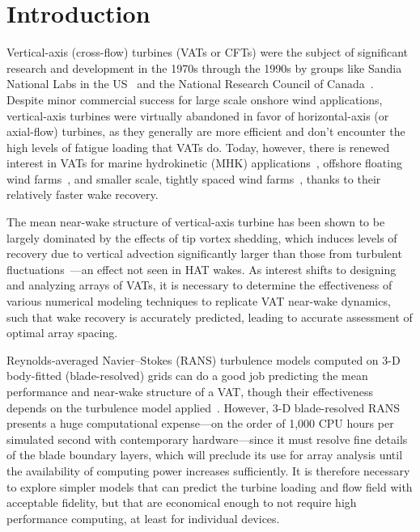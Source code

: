 \documentclass[times]{weauth}
\begin{document}

\maketitle


\section{Introduction}

Vertical-axis (cross-flow) turbines (VATs or CFTs) were the subject of
significant research and development in the 1970s through the 1990s by groups
like Sandia National Labs in the US~\cite{Sutherland2012} and the National
Research Council of Canada~\cite{Para2002}. Despite minor commercial success for
large scale onshore wind applications, vertical-axis turbines were virtually
abandoned in favor of horizontal-axis (or axial-flow) turbines, as they
generally are more efficient and don't encounter the high levels of fatigue
loading that VATs do. Today, however, there is renewed interest in VATs for
marine hydrokinetic (MHK) applications~\cite{ORPC2012}, offshore floating wind
farms~\cite{Paulsen2011, Sandia2012, Dodd2014}, and smaller scale, tightly
spaced wind farms~\cite{Dabiri2011, Kinzel2012}, thanks to their relatively
faster wake recovery.

The mean near-wake structure of vertical-axis turbine has been shown to be
largely dominated by the effects of tip vortex shedding, which induces levels of
recovery due to vertical advection significantly larger than those from
turbulent fluctuations~\cite{Bachant2015-JoT}---an effect not seen in HAT wakes.
As interest shifts to designing and analyzing arrays of VATs, it is necessary to
determine the effectiveness of various numerical modeling techniques to
replicate VAT near-wake dynamics, such that wake recovery is accurately
predicted, leading to accurate assessment of optimal array spacing.

Reynolds-averaged Navier--Stokes (RANS) turbulence models computed on 3-D
body-fitted (blade-resolved) grids can do a good job predicting the mean
performance and near-wake structure of a VAT, though their effectiveness depends
on the turbulence model
applied~\cite{Bachant2016-BR-CFD,Lam2016,Alaimo2015,Boudreau2015,Marsh2015}.
However, 3-D blade-resolved RANS presents a huge computational expense---on the
order of 1,000 CPU hours per simulated second with contemporary hardware---since
it must resolve fine details of the blade boundary layers, which will preclude
its use for array analysis until the availability of computing power increases
sufficiently. It is therefore necessary to explore simpler models that can
predict the turbine loading and flow field with acceptable fidelity, but that
are economical enough to not require high performance computing, at least for
individual devices.
\end{document}
